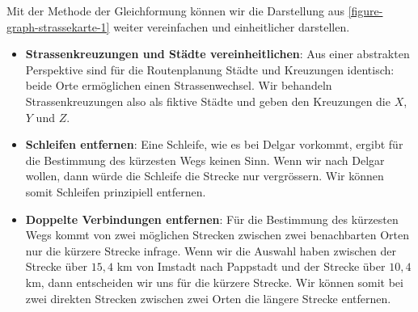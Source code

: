 Mit der Methode der Gleichformung können wir die Darstellung aus \autoref{figure-graph-strassekarte-1} weiter vereinfachen und einheitlicher darstellen.

\begin{itemize}
	\item \textbf{Strassenkreuzungen und Städte vereinheitlichen}: Aus einer abstrakten Perspektive sind für die Routenplanung Städte und Kreuzungen identisch: beide Orte ermöglichen einen Strassenwechsel. Wir behandeln Strassenkreuzungen also als fiktive Städte und geben den Kreuzungen die  $X$, $Y$ und $Z$.
	\item \textbf{Schleifen entfernen}: Eine Schleife, wie es bei Delgar vorkommt, ergibt für die Bestimmung des kürzesten Wegs keinen Sinn. Wenn wir nach Delgar wollen, dann würde die Schleife die Strecke nur vergrössern. Wir können somit Schleifen prinzipiell entfernen.
	\item \textbf{Doppelte Verbindungen entfernen}: Für die Bestimmung des kürzesten Wegs kommt von zwei möglichen Strecken zwischen zwei benachbarten Orten nur die kürzere Strecke infrage. Wenn wir die Auswahl haben zwischen der Strecke über $15,4$ km von Imstadt nach Pappstadt und der Strecke über $10,4$ km, dann entscheiden wir uns für die kürzere Strecke. Wir können somit bei zwei direkten Strecken zwischen zwei Orten die längere Strecke entfernen. 
\end{itemize}


